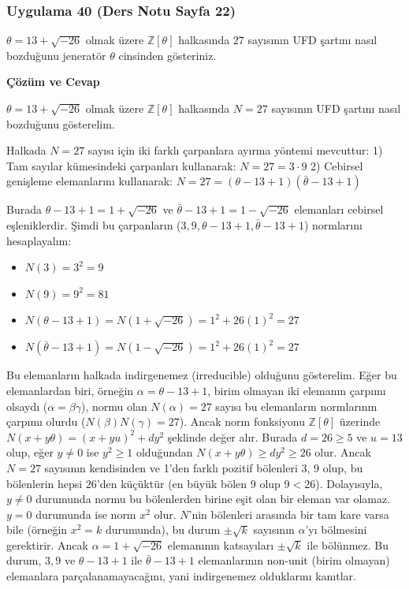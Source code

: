 \documentclass[11pt, a4paper]{article}
\newenvironment{cozum}{
    \vspace{0.5cm}
    \noindent\textcolor{green!60!black}{\faCheckCircle\enspace \textbf{\Large Çözüm ve Cevap}}\par\vspace{0.2cm}
}{}
\begin{document}
\newpage
\subsubsection{Uygulama 40 (Ders Notu Sayfa 22)}
\begin{sorubox}
$\theta = 13 + \sqrt{-26}$ olmak üzere $\mathbb{Z}[\theta]$ halkasında $27$ sayısının UFD şartını nasıl bozduğunu jeneratör $\theta$ cinsinden gösteriniz.
\end{sorubox}
\begin{cozum}
$\theta = 13 + \sqrt{-26}$ olmak üzere $\mathbb{Z}[\theta]$ halkasında $N = 27$ sayısının UFD şartını nasıl bozduğunu gösterelim.

Halkada $N = 27$ sayısı için iki farklı çarpanlara ayırma yöntemi mevcuttur:
1) Tam sayılar kümesindeki çarpanları kullanarak: $N = 27 = 3 \cdot 9$
2) Cebirsel genişleme elemanlarını kullanarak: $N = 27 = (\theta - 13 + 1)(\bar{\theta} - 13 + 1)$

Burada $\theta - 13 + 1 = 1 + \sqrt{-26}$ ve $\bar{\theta} - 13 + 1 = 1 - \sqrt{-26}$ elemanları cebirsel eşleniklerdir. Şimdi bu çarpanların ($3, 9, \theta - 13 + 1, \bar{\theta} - 13 + 1$) normlarını hesaplayalım:
\begin{itemize}
    \item $N(3) = 3^2 = 9$
    \item $N(9) = 9^2 = 81$
    \item $N(\theta - 13 + 1) = N(1 + \sqrt{-26}) = 1^2 + 26(1)^2 = 27$
    \item $N(\bar{\theta} - 13 + 1) = N(1 - \sqrt{-26}) = 1^2 + 26(1)^2 = 27$
\end{itemize}

Bu elemanların halkada indirgenemez (irreducible) olduğunu gösterelim. Eğer bu elemanlardan biri, örneğin $\alpha = \theta - 13 + 1$, birim olmayan iki elemanın çarpımı olsaydı ($\alpha = \beta \gamma$), normu olan $N(\alpha) = 27$ sayısı bu elemanların normlarının çarpımı olurdu ($N(\beta)N(\gamma) = 27$). Ancak norm fonksiyonu $\mathbb{Z}[\theta]$ üzerinde $N(x+y\theta) = (x+yu)^2 + dy^2$ şeklinde değer alır. Burada $d = 26 \ge 5$ ve $u = 13$ olup, eğer $y \neq 0$ ise $y^2 \ge 1$ olduğundan $N(x+y\theta) \ge dy^2 \ge 26$ olur. Ancak $N = 27$ sayısının kendisinden ve 1'den farklı pozitif bölenleri 3, 9 olup, bu bölenlerin hepsi $26$'den küçüktür (en büyük bölen 9 olup $9 < 26$). Dolayısıyla, $y \neq 0$ durumunda normu bu bölenlerden birine eşit olan bir eleman var olamaz. $y = 0$ durumunda ise norm $x^2$ olur. $N$'nin bölenleri arasında bir tam kare varsa bile (örneğin $x^2 = k$ durumunda), bu durum $\pm \sqrt{k}$ sayısının $\alpha$'yı bölmesini gerektirir. Ancak $\alpha = 1+\sqrt{-26}$ elemanının katsayıları $\pm \sqrt{k}$ ile bölünmez. Bu durum, $3, 9$ ve $\theta - 13 + 1$ ile $\bar{\theta} - 13 + 1$ elemanlarının non-unit (birim olmayan) elemanlara parçalanamayacağını, yani indirgenemez olduklarını kanıtlar.


\end{cozum}
\end{document}
